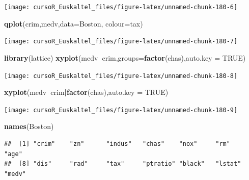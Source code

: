 \documentclass[]{book}
\newenvironment{Shaded}{\begin{snugshade}}{\end{snugshade}}
\newcommand{\KeywordTok}[1]{\textcolor[rgb]{0.13,0.29,0.53}{\textbf{#1}}}
\newcommand{\DataTypeTok}[1]{\textcolor[rgb]{0.13,0.29,0.53}{#1}}
\newcommand{\OtherTok}[1]{\textcolor[rgb]{0.56,0.35,0.01}{#1}}
\newcommand{\OperatorTok}[1]{\textcolor[rgb]{0.81,0.36,0.00}{\textbf{#1}}}
\newcommand{\NormalTok}[1]{#1}
\begin{document}
\begin{center}\texttt{[image: cursoR\_Euskaltel\_files/figure-latex/unnamed-chunk-180-6]} \end{center}

\begin{Shaded}
\begin{Highlighting}[]
\KeywordTok{qplot}\NormalTok{(crim,medv,}\DataTypeTok{data=}\NormalTok{Boston, }\DataTypeTok{colour=}\NormalTok{tax)}
\end{Highlighting}
\end{Shaded}

\begin{center}\texttt{[image: cursoR\_Euskaltel\_files/figure-latex/unnamed-chunk-180-7]} \end{center}

\begin{Shaded}
\begin{Highlighting}[]
\KeywordTok{library}\NormalTok{(lattice)}
\KeywordTok{xyplot}\NormalTok{(medv}\OperatorTok{~}\NormalTok{crim,}\DataTypeTok{groups=}\KeywordTok{factor}\NormalTok{(chas),}\DataTypeTok{auto.key =} \OtherTok{TRUE}\NormalTok{)}
\end{Highlighting}
\end{Shaded}

\begin{center}\texttt{[image: cursoR\_Euskaltel\_files/figure-latex/unnamed-chunk-180-8]} \end{center}

\begin{Shaded}
\begin{Highlighting}[]
\KeywordTok{xyplot}\NormalTok{(medv}\OperatorTok{~}\NormalTok{crim}\OperatorTok{|}\KeywordTok{factor}\NormalTok{(chas),}\DataTypeTok{auto.key =} \OtherTok{TRUE}\NormalTok{)}
\end{Highlighting}
\end{Shaded}

\begin{center}\texttt{[image: cursoR\_Euskaltel\_files/figure-latex/unnamed-chunk-180-9]} \end{center}

\begin{Shaded}
\begin{Highlighting}[]
\KeywordTok{names}\NormalTok{(Boston)}
\end{Highlighting}
\end{Shaded}

\begin{verbatim}
##  [1] "crim"    "zn"      "indus"   "chas"    "nox"     "rm"      "age"    
##  [8] "dis"     "rad"     "tax"     "ptratio" "black"   "lstat"   "medv"
\end{verbatim}
\end{document}
